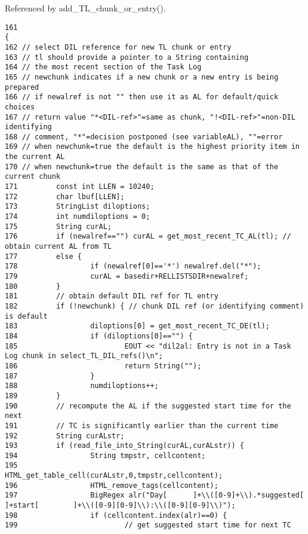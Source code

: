 Referenced by add\_\-TL\_\-chunk\_\-or\_\-entry().



\footnotesize\begin{verbatim}161                                                                        {
162 // select DIL reference for new TL chunk or entry
163 // tl should provide a pointer to a String containing
164 // the most recent section of the Task Log
165 // newchunk indicates if a new chunk or a new entry is being prepared
166 // if newalref is not "" then use it as AL for default/quick choices
167 // return value "*<DIL-ref>"=same as chunk, "!<DIL-ref>"=non-DIL identifying
168 // comment, "*"=decision postponed (see variableAL), ""=error
169 // when newchunk=true the default is the highest priority item in the current AL
170 // when newchunk=true the default is the same as that of the current chunk
171         const int LLEN = 10240;
172         char lbuf[LLEN];
173         StringList diloptions;
174         int numdiloptions = 0;
175         String curAL;
176         if (newalref=="") curAL = get_most_recent_TC_AL(tl); // obtain current AL from TL
177         else {
178                 if (newalref[0]=='*') newalref.del("*");
179                 curAL = basedir+RELLISTSDIR+newalref;
180         }
181         // obtain default DIL ref for TL entry
182         if (!newchunk) { // chunk DIL ref (or identifying comment) is default
183                 diloptions[0] = get_most_recent_TC_DE(tl);
184                 if (diloptions[0]=="") {
185                         EOUT << "dil2al: Entry is not in a Task Log chunk in select_TL_DIL_refs()\n";
186                         return String("");
187                 }
188                 numdiloptions++;
189         }
190         // recompute the AL if the suggested start time for the next
191         // TC is significantly earlier than the current time
192         String curALstr;
193         if (read_file_into_String(curAL,curALstr)) {
194                 String tmpstr, cellcontent;
195                 HTML_get_table_cell(curALstr,0,tmpstr,cellcontent);
196                 HTML_remove_tags(cellcontent);
197                 BigRegex alr("Day[      ]+\\([0-9]+\\).*suggested[      ]+start[        ]+\\([0-9][0-9]\\):\\([0-9][0-9]\\)");
198                 if (cellcontent.index(alr)==0) {
199                         // get suggested start time for next TC

\end{verbatim}
